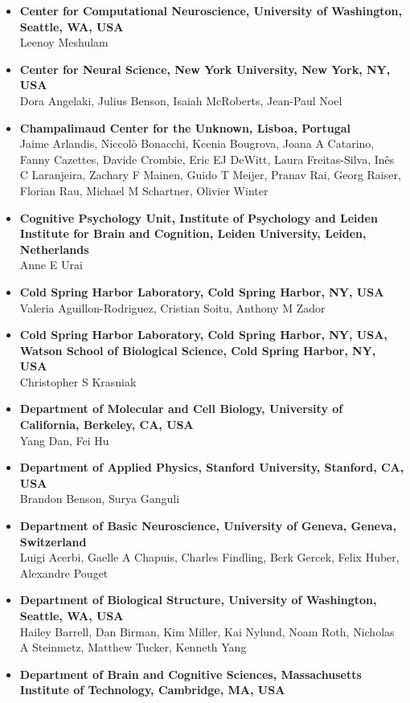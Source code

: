 \documentclass[10pt,lineno]{elife}
\begin{document}
\begin{itemize}
  \item \textbf{Center for Computational Neuroscience, University of Washington, Seattle, WA, USA}\\
  Leenoy Meshulam
  \item \textbf{Center for Neural Science, New York University, New York, NY, USA}\\
  Dora Angelaki, Julius Benson, Isaiah McRoberts, Jean-Paul Noel
  \item \textbf{Champalimaud Center for the Unknown, Lisboa, Portugal}\\
  Jaime Arlandis, Niccolò Bonacchi, Kcenia Bougrova, Joana A Catarino, Fanny Cazettes, Davide Crombie, Eric EJ DeWitt, Laura Freitas-Silva, Inês C Laranjeira, Zachary F Mainen, Guido T Meijer, Pranav Rai, Georg Raiser, Florian Rau, Michael M Schartner, Olivier Winter
  \item \textbf{Cognitive Psychology Unit, Institute of Psychology and Leiden Institute for Brain and Cognition, Leiden University, Leiden, Netherlands}\\
  Anne E Urai
  \item \textbf{Cold Spring Harbor Laboratory, Cold Spring Harbor, NY, USA}\\
  Valeria Aguillon-Rodriguez, Cristian Soitu, Anthony M Zador
  \item \textbf{Cold Spring Harbor Laboratory, Cold Spring Harbor, NY, USA, Watson School of Biological Science, Cold Spring Harbor, NY, USA}\\
  Christopher S Krasniak
  \item \textbf{Department of  Molecular and Cell Biology, University of California, Berkeley, CA, USA}\\
  Yang Dan, Fei Hu
  \item \textbf{Department of Applied Physics, Stanford University, Stanford, CA, USA}\\
  Brandon Benson, Surya Ganguli
  \item \textbf{Department of Basic Neuroscience, University of Geneva, Geneva, Switzerland}\\
  Luigi Acerbi, Gaelle A Chapuis, Charles Findling, Berk Gercek, Felix Huber, Alexandre Pouget
  \item \textbf{Department of Biological Structure, University of Washington, Seattle, WA, USA}\\
  Hailey Barrell, Dan Birman, Kim Miller, Kai Nylund, Noam Roth, Nicholas A Steinmetz, Matthew Tucker, Kenneth Yang
  \item \textbf{Department of Brain and Cognitive Sciences, Massachusetts Institute of Technology, Cambridge, MA, USA}\\

\end{itemize}
\end{document}
